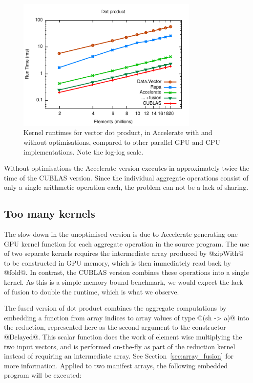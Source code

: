 \begin{figure}
    \begin{center}
        \includegraphics[width=0.8\textwidth]{images/results/dotp/dotp}
    \end{center}
    \caption[Vector dot product kernel benchmarks]{Kernel runtimes for vector
        dot product, in Accelerate with and without optimisations, compared to
        other parallel GPU and CPU implementations. Note the log-log scale.}
    \label{fig:dotp}
\end{figure}

Without optimisations the Accelerate version executes in approximately twice the
time of the CUBLAS version. Since the individual aggregate operations consist of
only a single arithmetic operation each, the problem can not be a lack of
sharing.


\subsection{Too many kernels}

The slow-down in the unoptimised version is due to Accelerate generating one GPU
kernel function for each aggregate operation in the source program. The use of
two separate kernels requires the intermediate array produced by @zipWith@ to be
constructed in GPU memory, which is then immediately read back by @fold@. In
contrast, the CUBLAS version combines these operations into a single kernel. As
this is a simple memory bound benchmark, we would expect the lack of fusion to
double the runtime, which is what we observe.

The fused version of dot product combines the aggregate computations by
embedding a function from array indices to array values of type @(sh -> a)@ into
the reduction, represented here as the second argument to the constructor
@Delayed@. This scalar function does the work of element wise multiplying the
two input vectors, and is performed on-the-fly as part of the reduction kernel
instead of requiring an intermediate array. See Section~\ref{sec:array_fusion}
for more information. Applied to two manifest arrays, the following embedded
program will be executed:

